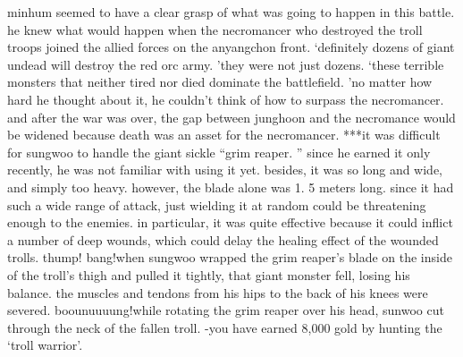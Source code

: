 minhum seemed to have a clear grasp of what was going to happen in this battle.
 he knew what would happen when the necromancer who destroyed the troll troops joined the allied forces on the anyangchon front.
‘definitely dozens of giant undead will destroy the red orc army.
’they were not just dozens.
‘these terrible monsters that neither tired nor died dominate the battlefield.
’no matter how hard he thought about it, he couldn’t think of how to surpass the necromancer.
and after the war was over, the gap between junghoon and the necromance would be widened because death was an asset for the necromancer.
***it was difficult for sungwoo to handle the giant sickle “grim reaper.
” since he earned it only recently, he was not familiar with using it yet.
 besides, it was so long and wide, and simply too heavy.
however, the blade alone was 1.
5 meters long.
 since it had such a wide range of attack, just wielding it at random could be threatening enough to the enemies.
in particular, it was quite effective because it could inflict a number of deep wounds, which could delay the healing effect of the wounded trolls.
thump! bang!when sungwoo wrapped the grim reaper’s blade on the inside of the troll’s thigh and pulled it tightly, that giant monster fell, losing his balance.
 the muscles and tendons from his hips to the back of his knees were severed.
boounuuuung!while rotating the grim reaper over his head, sunwoo cut through the neck of the fallen troll.
-you have earned 8,000 gold by hunting the ‘troll warrior’.


 